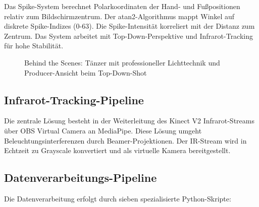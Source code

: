 Das Spike-System berechnet Polarkoordinaten der Hand- und Fußpositionen relativ zum Bildschirmzentrum. Der atan2-Algorithmus mappt Winkel auf diskrete Spike-Indizes (0-63). Die Spike-Intensität korreliert mit der Distanz zum Zentrum. Das System arbeitet mit Top-Down-Perspektive und Infrarot-Tracking für hohe Stabilität.

\begin{figure}[htbp]
    \centering
    \caption{Behind the Scenes: Tänzer mit professioneller Lichttechnik und Producer-Ansicht beim Top-Down-Shot}
    \label{fig:studio_wide}
\end{figure}

\clearpage
\subsection{Infrarot-Tracking-Pipeline}


Die zentrale Lösung besteht in der Weiterleitung des Kinect V2 Infrarot-Streams über OBS Virtual Camera an MediaPipe. Diese Lösung umgeht Beleuchtungsinterferenzen durch Beamer-Projektionen. Der IR-Stream wird in Echtzeit zu Grayscale konvertiert und als virtuelle Kamera bereitgestellt.

\subsection*{Datenverarbeitungs-Pipeline}


Die Datenverarbeitung erfolgt durch sieben spezialisierte Python-Skripte:


